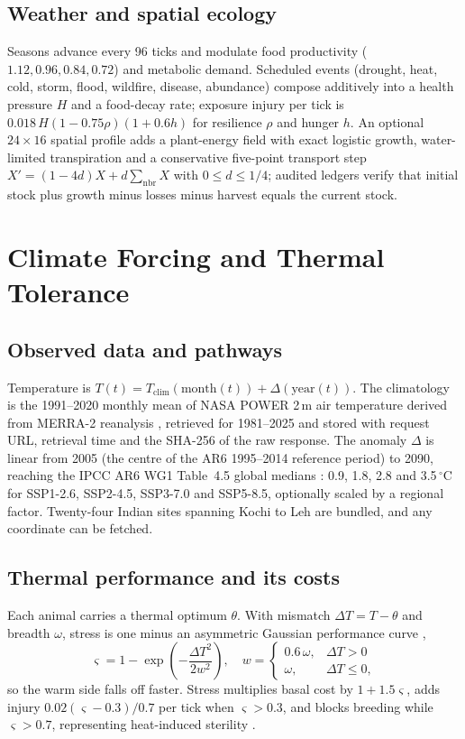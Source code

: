 \documentclass[conference]{IEEEtran}
\begin{document}
\subsection{Weather and spatial ecology}
Seasons advance every 96 ticks and modulate food productivity
($1.12, 0.96, 0.84, 0.72$) and metabolic demand. Scheduled events (drought, heat,
cold, storm, flood, wildfire, disease, abundance) compose additively into a health
pressure $H$ and a food-decay rate; exposure injury per tick is
$0.018\,H(1-0.75\rho)(1+0.6h)$ for resilience $\rho$ and hunger $h$. An optional
$24\times16$ spatial profile adds a plant-energy field with exact logistic growth,
water-limited transpiration and a conservative five-point transport step
$X'=(1-4d)X+d\sum_{\text{nbr}}X$ with $0\le d\le1/4$; audited ledgers verify that
initial stock plus growth minus losses minus harvest equals the current stock.

\section{Climate Forcing and Thermal Tolerance}
\label{sec:climate}
\subsection{Observed data and pathways}
Temperature is $T(t)=T_{\text{clim}}(\text{month}(t))+\Delta(\text{year}(t))$.
The climatology is the 1991--2020 monthly mean of NASA POWER 2\,m air temperature
derived from MERRA-2 reanalysis \cite{gelaro2017}, retrieved for 1981--2025 and
stored with request URL, retrieval time and the SHA-256 of the raw response. The
anomaly $\Delta$ is linear from 2005 (the centre of the AR6 1995--2014 reference
period) to 2090, reaching the IPCC AR6 WG1 Table~4.5 global medians
\cite{ipcc2021}: 0.9, 1.8, 2.8 and 3.5\,$^{\circ}$C for SSP1-2.6, SSP2-4.5,
SSP3-7.0 and SSP5-8.5, optionally scaled by a regional factor. Twenty-four Indian
sites spanning Kochi to Leh are bundled, and any coordinate can be fetched.

\subsection{Thermal performance and its costs}
Each animal carries a thermal optimum $\theta$. With mismatch $\Delta T=T-\theta$
and breadth $\omega$, stress is one minus an asymmetric Gaussian performance
curve \cite{huey1989},
\begin{equation}
\varsigma=1-\exp\!\left(-\frac{\Delta T^2}{2w^2}\right),\quad
w=\begin{cases}0.6\,\omega,&\Delta T>0\\ \omega,&\Delta T\le0,\end{cases}
\label{eq:stress}
\end{equation}
so the warm side falls off faster. Stress multiplies basal cost by $1+1.5\varsigma$,
adds injury $0.02(\varsigma-0.3)/0.7$ per tick when $\varsigma>0.3$, and blocks
breeding while $\varsigma>0.7$, representing heat-induced sterility \cite{walsh2019}.
\end{document}
